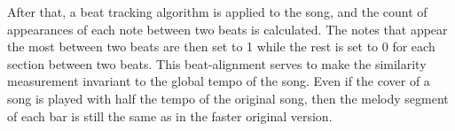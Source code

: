\noindent After that, a beat tracking algorithm is applied to the song, and the count of appearances of each note between two beats is calculated. The notes that appear the most between two beats are then set to 1 while the rest is set to 0 for each section between two beats. This beat-alignment serves to make the similarity measurement invariant to the global tempo of the song. Even if the cover of a song is played with half the tempo of the original song, then the melody segment of each bar is still the same as in the faster original version.

\begin{figure}[htbp]
	\centering
\end{figure}

